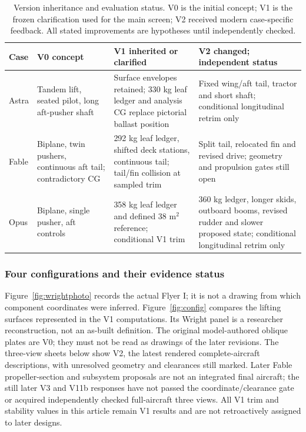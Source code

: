 \documentclass[11pt,a4paper]{article}
\begin{document}
\begin{table}[H]\centering\footnotesize
\caption{Version inheritance and evaluation status. V0 is the initial concept; V1 is the frozen clarification used for the main screen; V2 received modern case-specific feedback. All stated improvements are hypotheses until independently checked.}\label{tab:stage}
\begin{tabularx}{\linewidth}{lXXX}\toprule
Case & V0 concept & V1 inherited or clarified & V2 changed; independent status\\\midrule
Astra & Tandem lift, seated pilot, long aft-pusher shaft & Surface envelopes retained; 330 kg leaf ledger and analysis CG replace pictorial ballast position & Fixed wing/aft tail, tractor and short shaft; conditional longitudinal retrim only\\
Fable & Biplane, twin pushers, continuous aft tail; contradictory CG & 292 kg leaf ledger, shifted deck stations, continuous tail; tail/fin collision at sampled trim & Split tail, relocated fin and revised drive; geometry and propulsion gates still open\\
Opus & Biplane, single pusher, aft controls & 358 kg leaf ledger and defined 38 m$^2$ reference; conditional V1 trim & 360 kg ledger, longer skids, outboard booms, revised rudder and slower proposed state; conditional longitudinal retrim only\\\bottomrule
\end{tabularx}
\end{table}



\subsubsection{Four configurations and their evidence status}
Figure~\ref{fig:wrightphoto} records the actual Flyer I; it is not a drawing from which component coordinates were inferred. Figure~\ref{fig:config} compares the lifting surfaces represented in the V1 computations. Its Wright panel is a researcher reconstruction, not an as-built definition. The original model-authored oblique plates are V0; they must not be read as drawings of the later revisions. The three-view sheets below show V2, the latest rendered complete-aircraft descriptions, with unresolved geometry and clearances still marked. Later Fable propeller-section and subsystem proposals are not an integrated final aircraft; the still later V3 and V11b responses have not passed the coordinate/clearance gate or acquired independently checked full-aircraft three views. All V1 trim and stability values in this article remain V1 results and are not retroactively assigned to later designs.
\end{document}
